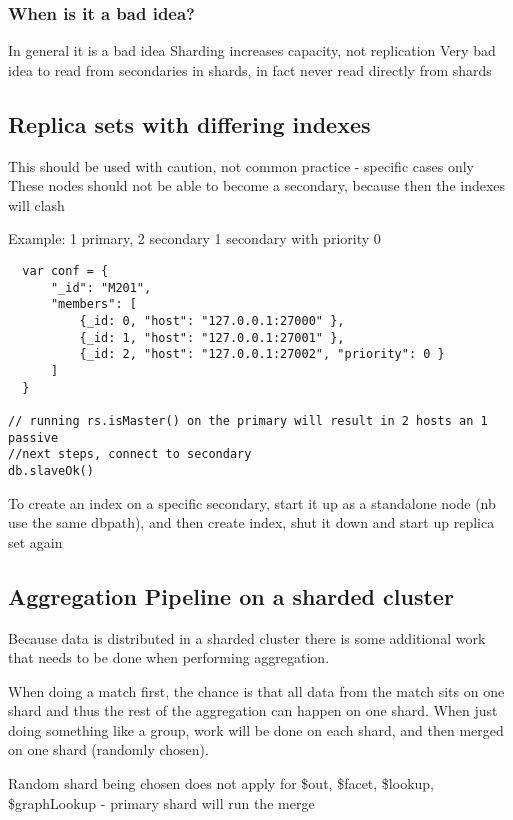 \documentclass[11pt]{article}
\begin{document}
\subsubsection{When is it a bad idea?}
\label{sec:org68d2390}
In general it is a bad idea
Sharding increases capacity, not replication
Very bad idea to read from secondaries in shards, in fact never read directly from shards

\subsection{Replica sets with differing indexes}
\label{sec:orgd25a2d7}
This should be used with caution, not common practice - specific cases only
These nodes should not be able to become a secondary, because then the indexes will clash

Example:
1 primary, 2 secondary
1 secondary with priority 0
\begin{verbatim}
  var conf = {
      "_id": "M201",
      "members": [
          {_id: 0, "host": "127.0.0.1:27000" },
          {_id: 1, "host": "127.0.0.1:27001" },
          {_id: 2, "host": "127.0.0.1:27002", "priority": 0 }
      ]
  }

// running rs.isMaster() on the primary will result in 2 hosts an 1 passive
//next steps, connect to secondary
db.slaveOk()
\end{verbatim}

To create an index on a specific secondary, start it up as a standalone node (nb use the same dbpath), and then create index, shut it down and start up replica set again



\subsection{Aggregation Pipeline on a sharded cluster}
\label{sec:orga7c6d95}
Because data is distributed in a sharded cluster there is some additional work that needs to be done when performing aggregation.

When doing a match first, the chance is that all data from the match sits on one shard and thus the rest of the aggregation can happen on one shard.
When just doing something like a group, work will be done on each shard, and then merged on one shard (randomly chosen).

Random shard being chosen does not apply for \$out, \$facet, \$lookup, \$graphLookup - primary shard will run the merge
\end{document}
